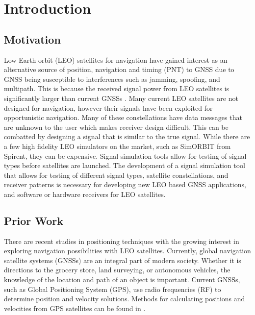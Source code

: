 \documentclass[12pt]{report}
\begin{document}
\normalem       %

 \chapter { Introduction}  %

\section { \normalfont Motivation}

Low Earth orbit (LEO) satellites for navigation have gained interest as an alternative source of position, navigation and timing (PNT) to GNSS due to GNSS being susceptible to interferences such as jamming, spoofing, and multipath. This is because the received signal power from LEO satellites is significantly larger than current GNSSs \cite{reidSatelliteNavigationAge2020}. Many current LEO satellites are not designed for navigation, however their signals have been exploited for opportunistic navigation. Many of these constellations have data messages that are unknown to the user which makes receiver design difficult. This can be combatted by designing a signal that is similar to the true signal. While there are a few high fidelity LEO simulators on the market, such as SimORBIT from Spirent, they can be expensive. Signal simulation tools allow for testing of signal types before satellites are launched. The development of a signal simulation tool that allows for testing of different signal types, satellite constellations, and receiver patterns is necessary for developing new LEO based GNSS applications, and software or hardware receivers for LEO satellites.

\section { Prior Work }

There are recent studies in positioning techniques with the growing interest in exploring navigation possibilities with LEO satellites. Currently, global navigation satellite systems (GNSSs) are an integral part of modern society. Whether it is directions to the grocery store, land surveying, or autonomous vehicles, the knowledge of the location and path of an object is important. Current GNSSs, such as Global Positioning System (GPS), use radio frequencies (RF) to determine position and velocity solutions. Methods for calculating positions and velocities from GPS satellites can be found in \cite{misraGlobalPositioningSystem2012}. 
\end{document}
